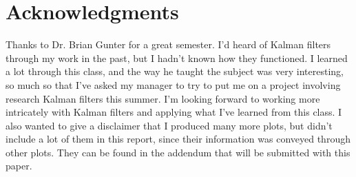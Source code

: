 \documentclass[letterpaper, paper,11pt]{AAS}	%
\begin{document}
\section{Acknowledgments}

Thanks to Dr. Brian Gunter for a great semester. I'd heard of Kalman filters through my work in the past, but I hadn't known how they functioned. I learned a lot through this class, and the way he taught the subject was very interesting, so much so that I've asked my manager to try to put me on a project involving research Kalman filters this summer. I'm looking forward to working more intricately with Kalman filters and applying what I've learned from this class. I also wanted to give a disclaimer that I produced many more plots, but didn't include a lot of them in this report, since their information was conveyed through other plots. They can be found in the addendum that will be submitted with this paper.
\end{document}
